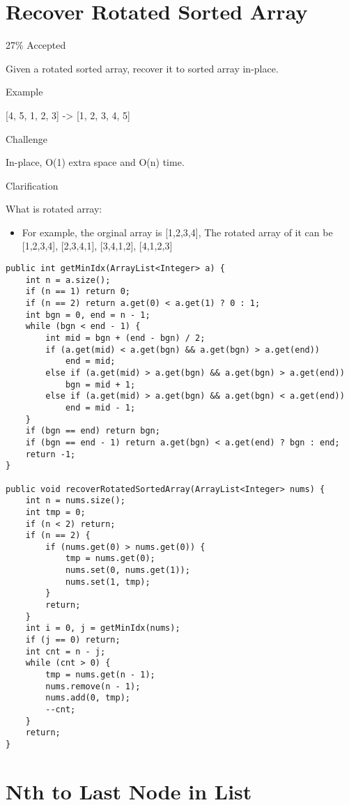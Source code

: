 \documentclass[9pt, b5paaper]{book}
\begin{document}
\section{Recover Rotated Sorted Array}
\label{sec-1-50}

27\% Accepted

Given a rotated sorted array, recover it to sorted array in-place.

Example

[4, 5, 1, 2, 3] -> [1, 2, 3, 4, 5]

Challenge

In-place, O(1) extra space and O(n) time.

Clarification

What is rotated array:

\begin{itemize}
\item For example, the orginal array is [1,2,3,4], The rotated array of it can be [1,2,3,4], [2,3,4,1], [3,4,1,2], [4,1,2,3]
\end{itemize}
\begin{verbatim}
public int getMinIdx(ArrayList<Integer> a) {
    int n = a.size();
    if (n == 1) return 0;
    if (n == 2) return a.get(0) < a.get(1) ? 0 : 1;
    int bgn = 0, end = n - 1;
    while (bgn < end - 1) {
        int mid = bgn + (end - bgn) / 2;
        if (a.get(mid) < a.get(bgn) && a.get(bgn) > a.get(end))
            end = mid;
        else if (a.get(mid) > a.get(bgn) && a.get(bgn) > a.get(end))
            bgn = mid + 1;
        else if (a.get(mid) > a.get(bgn) && a.get(bgn) < a.get(end))
            end = mid - 1;
    }
    if (bgn == end) return bgn;
    if (bgn == end - 1) return a.get(bgn) < a.get(end) ? bgn : end;
    return -1;
}
        
public void recoverRotatedSortedArray(ArrayList<Integer> nums) {
    int n = nums.size();
    int tmp = 0;
    if (n < 2) return;
    if (n == 2) {
        if (nums.get(0) > nums.get(0)) {
            tmp = nums.get(0);
            nums.set(0, nums.get(1));
            nums.set(1, tmp);
        }
        return;
    }
    int i = 0, j = getMinIdx(nums);
    if (j == 0) return;
    int cnt = n - j;
    while (cnt > 0) {
        tmp = nums.get(n - 1);
        nums.remove(n - 1);
        nums.add(0, tmp);
        --cnt;
    }
    return;
}
\end{verbatim}
\section{Nth to Last Node in List}
\label{sec-1-51}
\end{document}

